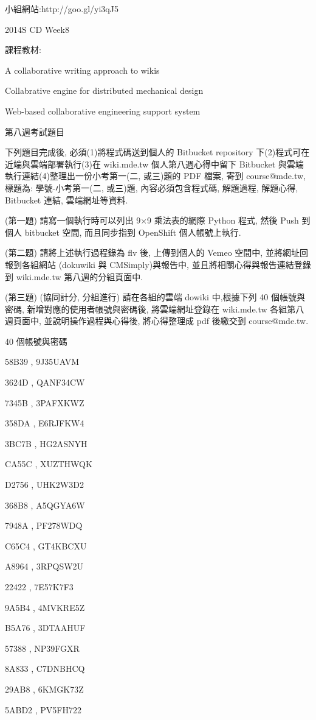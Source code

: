 \documentclass[]{article}
\begin{document}
小組網站:http://goo.gl/yi3qJ5

2014S CD Week8

課程教材:

A collaborative writing approach to wikis

Collabrative engine for distributed mechanical design

Web-based collaborative engineering support system

第八週考試題目

下列題目完成後, 必須(1)將程式碼送到個人的 Bitbucket repository
下(2)程式可在近端與雲端部署執行(3)在 wiki.mde.tw 個人第八週心得中留下
Bitbucket 與雲端執行連結(4)整理出一份小考第一(二, 或三)題的 PDF 檔案,
寄到 course@mde.tw, 標題為: 學號-小考第一(二, 或三)題,
內容必須包含程式碼, 解題過程, 解題心得, Bitbucket 連結, 雲端網址等資料.

(第一題) 請寫一個執行時可以列出 9×9 乘法表的網際 Python 程式, 然後 Push
到個人 bitbucket 空間, 而且同步指到 OpenShift 個人帳號上執行.

(第二題) 請將上述執行過程錄為 flv 後, 上傳到個人的 Vemeo 空間中,
並將網址回報到各組網站 (dokuwiki 與 CMSimply)與報告中,
並且將相關心得與報告連結登錄到 wiki.mde.tw 第八週的分組頁面中.

(第三題) (協同計分, 分組進行) 請在各組的雲端 dowiki 中,根據下列 40
個帳號與密碼, 新增對應的使用者帳號與密碼後, 將雲端網址登錄在 wiki.mde.tw
各組第八週頁面中, 並說明操作過程與心得後, 將心得整理成 pdf 後繳交到
course@mde.tw.

40 個帳號與密碼

58B39 , 9J35UAVM

3624D , QANF34CW

7345B , 3PAFXKWZ

358DA , E6RJFKW4

3BC7B , HG2ASNYH

CA55C , XUZTHWQK

D2756 , UHK2W3D2

368B8 , A5QGYA6W

7948A , PF278WDQ

C65C4 , GT4KBCXU

A8964 , 3RPQSW2U

22422 , 7E57K7F3

9A5B4 , 4MVKRE5Z

B5A76 , 3DTAAHUF

57388 , NP39FGXR

8A833 , C7DNBHCQ

29AB8 , 6KMGK73Z

5ABD2 , PV5FH722
\end{document}
